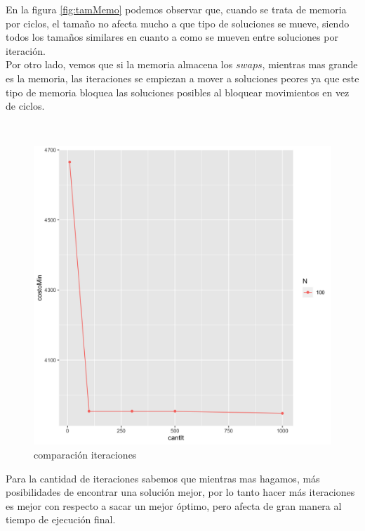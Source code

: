 \documentclass[10pt,a4paper]{article}
\begin{document}
En la figura \ref{fig:tamMemo} podemos observar que, cuando se trata de memoria por ciclos, el tamaño no afecta mucho a que tipo de soluciones se mueve, siendo todos los tamaños similares en cuanto a como se mueven entre soluciones por iteración. \\

Por otro lado, vemos que si la memoria almacena los $swaps$, mientras mas grande es la memoria, las iteraciones se empiezan a mover a soluciones peores ya que este tipo de memoria bloquea las soluciones posibles al bloquear movimientos en vez de ciclos.

\\
\begin{figure} [H]
    \centering
    \includegraphics[scale=0.15]{img/iteracionesTabu.png}
    \caption{comparación iteraciones}
    \label{fig:it}
\end{figure}

Para la cantidad de iteraciones sabemos que mientras mas hagamos, más posibilidades de encontrar una solución mejor, por lo tanto hacer más iteraciones es mejor con respecto a sacar un mejor óptimo, pero afecta de gran manera al tiempo de ejecución final.
\end{document}
